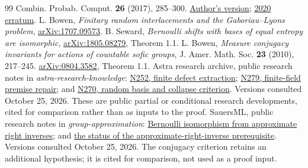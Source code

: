 \documentclass[11pt,a4paper]{article}
\numberwithin{equation}{section}
\begin{document}
\begin{thebibliography}{99}
Combin. Probab. Comput. \textbf{26} (2017), 285--300.
\href{https://rdlyons.pages.iu.edu/pdf/fiid.pdf}{Author's version};
\href{https://rdlyons.pages.iu.edu/errata/fiid.pdf}{2020 erratum}.
L. Bowen, \emph{Finitary random interlacements and the Gaboriau--Lyons problem},
\href{https://arxiv.org/abs/1707.09573}{arXiv:1707.09573}.
B. Seward,
\emph{Bernoulli shifts with bases of equal entropy are isomorphic},
\href{https://arxiv.org/abs/1805.08279}{arXiv:1805.08279}, Theorem 1.1.
L. Bowen,
\emph{Measure conjugacy invariants for actions of countable sofic groups},
J. Amer. Math. Soc. \textbf{23} (2010), 217--245.
\href{https://arxiv.org/abs/0804.3582}{arXiv:0804.3582}, Theorem 1.1.
Astra research archive, public research notes in
\emph{astra-research-knowledge}:
\href{https://github.com/harjassand/astra-research-knowledge/blob/39cdea532f19217f633f70315d92c314a6ce5e3e/cards/N252-finite-defect-Bernoulli-extraction.txt}{N252, finite defect extraction};
\href{https://github.com/harjassand/astra-research-knowledge/blob/0146b0d4d6ea02edf757bdb69a517378bf801578/cards/N279-finite-field-Bernoulli-premise-repair.txt}{N279, finite-field premise repair}; and
\href{https://github.com/harjassand/astra-research-knowledge/blob/142ac61f9b738eeddd466e9cc591b607689a542d/web/pages/d-377e83d87f921de6.html}{N270, random basis and collapse criterion}.
Versions consulted October 25, 2026. These are public partial or conditional
research developments, cited for comparison rather than as inputs to the proof.
SauersML, public research notes in \emph{group-approximation}:
\href{https://github.com/SauersML/group-approximation/blob/0d15e308d317eeed73fbdb4e006797a4d6b080d7/research/bernoulli-isomorphism-from-approximate-right-inverses.md}{Bernoulli isomorphism from approximate right inverses}; and
\href{https://github.com/SauersML/group-approximation/blob/ba6d9b822153b7feb2de9ce2caead1c30a18050f/research/zero-supremum-endomorphisms-have-approximate-right-inverses.md}{the status of the approximate-right-inverse prerequisite}.
Versions consulted October 25, 2026. The conjugacy criterion retains an
additional hypothesis; it is cited for comparison, not used as a proof input.
\end{thebibliography}
\end{document}
